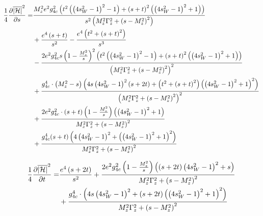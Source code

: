 \documentclass{article}
\begin{document}
\begin{align*}
	\frac{1}{4}\pdv{\overline{|\mathcal{H}|}^2}{s} = &\frac{M_{z}^{2} e^{2} g_{4c}^{2} \left(t^{2} \left(\left(4 s_{W}^{2} - 1\right)^{2} - 1\right) + \left(s + t\right)^{2} \left(\left(4 s_{W}^{2} - 1\right)^{2} + 1\right)\right)}{s^{2} \left(M_{z}^{2} \Gamma_{z}^{2} + \left(s - M_{z}^{2}\right)^{2}\right)}\\&
	+ \frac{e^{4} \left(s + t\right)}{s^{2}}
	- \frac{e^{4} \left(t^2 + \left(s + t\right)^{2}\right)}{s^{3}}\\&
	- \frac{2e^{2} g_{4c}^{2} s \left(1 - \frac{M_{z}^{2}}{s}\right)^2 \left(t^{2} \left(\left(4 s_{W}^{2} - 1\right)^{2} - 1\right) + \left(s + t\right)^{2} \left(\left(4 s_{W}^{2} - 1\right)^{2} + 1\right)\right)}{\left(M_{z}^{2} \Gamma_{z}^{2} + \left(s - M_{z}^{2}\right)^{2}\right)^{2}}\\&
	+ \frac{g_{4c}^{4} \cdot \left(M_{z}^{2} - s\right) \left(4s\left(4 s_{W}^{2} - 1\right)^2 \left(s+2t\right) + \left(t^{2} + \left(s + t\right)^{2}\right) \left(\left(4 s_{W}^{2} - 1\right)^{2} + 1\right)^{2}\right)}{\left(M_{z}^{2} \Gamma_{z}^{2} + \left(s - M_{z}^{2}\right)^{2}\right)^{2}}\\&
	+ \frac{2e^{2} g_{4c}^{2} \cdot \left(s + t\right) \left(1 - \frac{M_{z}^{2}}{s}\right) \left(\left(4 s_{W}^{2} - 1\right)^{2} + 1\right)}{M_{z}^{2} \Gamma_{z}^{2} + \left(s - M_{z}^{2}\right)^{2}}\\&
	+ \frac{g_{4c}^{4}(s+t) \left(4 \left(4 s_{W}^{2} - 1\right)^2 + \left(\left(4 s_{W}^{2} - 1\right)^{2} + 1\right)^{2}\right)}{M_{z}^{2} \Gamma_{z}^{2} + \left(s - M_{z}^{2}\right)^{2}}
\end{align*}

\begin{align*}
	\frac{1}{4}\pdv{\overline{|\mathcal{H}|}^2}{t} = &\frac{e^{4} \left(s + 2 t\right)}{s^{2}}
	+ \frac{2e^{2} g_{4c}^{2} \left(1 - \frac{M_{z}^{2}}{s}\right) \left((s+2t) \left(4 s_{W}^{2} - 1\right)^{2} + s\right)}{M_{z}^{2} \Gamma_{z}^{2} + \left(s - M_{z}^{2}\right)^{2}}\\&
	+ \frac{g_{4c}^{4} \cdot \left(4 s \left(4 s_{W}^{2} - 1\right)^2 + \left(s + 2t\right) \left(\left(4 s_{W}^{2} - 1\right)^{2} + 1\right)^{2}\right)}{M_{z}^{2} \Gamma_{z}^{2} + \left(s - M_{z}^{2}\right)^{2}}
\end{align*}
\end{document}
